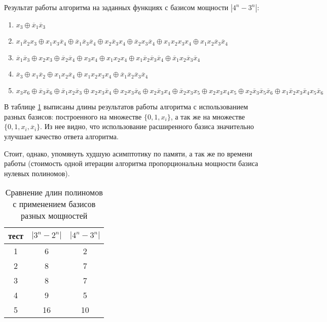 \documentclass[a4paper,12pt,titlepage,finall]{article}
\begin{document}
Результат работы алгоритма на заданных функциях с базисом мощности $ \left| 4^n - 3^n \right| $:
\begin{enumerate}
    \item $ x_3 \oplus \overline x_1 \overline x_3 $
    \item $ x_1 \overline x_2 x_3 \oplus x_1 x_3 \overline x_4 \oplus \overline x_1 \overline x_3 \overline x_4 \oplus x_2 \overline x_3 x_4 \oplus \overline x_2 x_3 \overline x_4 \oplus x_1 x_2 x_3 x_4 \oplus x_1 x_2 \overline x_3 \overline x_4 $
    \item $ \overline x_1 \overline x_3 \oplus x_2 x_3 \oplus \overline x_2 \overline x_4 \oplus x_3 x_4 \oplus x_1 x_2 x_4 \oplus x_1 \overline x_2 \overline x_3 \overline x_4 \oplus \overline x_1 x_2 \overline x_3 \overline x_4 $
    \item $ \overline x_3 \oplus x_1 \overline x_2 \oplus x_1 x_2 \overline x_4 \oplus x_1 x_2 x_3 x_4 \oplus \overline x_1 \overline x_2 \overline x_3 \overline x_4 $
    \item $ x_3 x_6 \oplus \overline x_3 \overline x_6 \oplus \overline x_1 x_2 \overline x_3 \oplus x_2 x_3 \overline x_4 \oplus x_2 x_3 \overline x_6 \oplus x_2 \overline x_3 x_4 \oplus \overline x_2 x_3 x_5 \oplus x_2 x_3 x_4 x_5 \oplus x_2 \overline x_3 \overline x_5 \overline x_6 \oplus x_1 \overline x_2 x_3 \overline x_4 x_5 \overline x_6 $
\end{enumerate}

В таблице \ref{table_result} выписаны длины результатов работы алгоритма с использованием разных базисов: построенного на множестве $ \{ 0, 1, x_i \} $, а так же на множестве $ \{ 0, 1, x_i, \overline x_i \} $. Из нее видно, что использование расширенного базиса значительно улучшает качество ответа алгоритма.

Стоит, однако, упомянуть худшую асимптотику по памяти, а так же по времени работы (стоимость одной итерации алгоритма пропорциональна мощности базиса нулевых полиномов).

\begin{table}[h!]
\centering
\begin{tabular}{ |c||c|c| }
\hline
тест & $ \left| 3^n - 2^n \right| $ & $ \left| 4^n - 3^n \right| $ \\
\hline\hline
1 & 6  & 2  \\
\hline
2 & 8  & 7  \\
\hline
3 & 8  & 7  \\
\hline
4 & 9  & 5  \\
\hline
5 & 16 & 10 \\
\hline
\end{tabular}
\caption{Сравнение длин полиномов с применением базисов разных мощностей}
\label{table_result}
\end{table}
\end{document}
